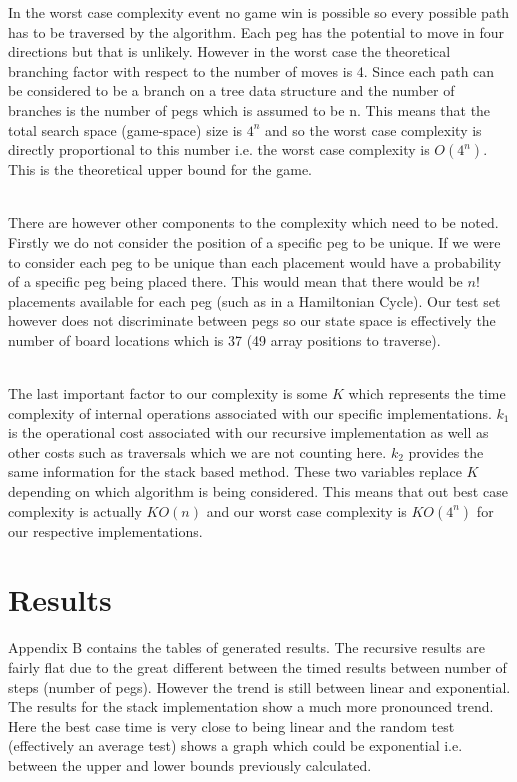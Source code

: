 \documentclass[a4paper]{article}
\begin{document}

\noindent In the worst case complexity event no game win is possible so every possible path has to be traversed by the algorithm. Each peg has the potential to move in four directions but that is unlikely. However in the worst case the theoretical branching factor with respect to the number of moves is 4. Since each path can be considered to be a branch on a tree data structure and the number of branches is the number of pegs which is assumed to be n. This means that the total search space (game-space) size is $4^n$ and so the worst case complexity is directly proportional to this number i.e. the worst case complexity is $O(4^n)$. This is the theoretical upper bound for the game.\\\

\noindent There are however other components to the complexity which need to be noted. Firstly we do not consider the position of a specific peg to be unique. If we were to consider each peg to be unique than each placement would have a probability of a specific peg being placed there. This would mean that there would be $n!$ placements available for each peg (such as in a Hamiltonian Cycle). Our test set however does not discriminate between pegs so our state space is effectively the number of board locations which is 37 (49 array positions to traverse).\\\

\noindent The last important factor to our complexity is some $K$ which represents the time complexity of internal operations associated with our specific implementations. $k_1$ is the operational cost associated with our recursive implementation as well as other costs such as traversals which we are not counting here. $k_2$ provides the same information for the stack based method. These two variables replace $K$ depending on which algorithm is being considered. This means that out best case complexity is actually $KO(n)$ and our worst case complexity is $KO(4^n)$ for our respective implementations.

\section{Results}
Appendix B contains the tables of generated results. The recursive results are fairly flat due to the great different between the timed results between number of steps (number of pegs). However the trend is still between linear and exponential. The results for the stack implementation show a much more pronounced trend. Here the best case time is very close to being linear and the random test (effectively an average test) shows a graph which could be exponential i.e. between the upper and lower bounds previously calculated. \\\
\end{document}
